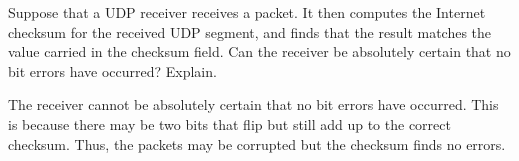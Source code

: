 \documentclass{report}
\begin{document}
\mktitle

\begin{problem}
Suppose that a UDP receiver receives a packet. It then computes the Internet checksum for the received UDP segment, and finds that the result matches the value carried in the checksum field. Can the receiver be absolutely certain that no bit errors have occurred? Explain.
\medskip

\begin{answer}{50em}
    The receiver cannot be absolutely certain that no bit errors have occurred. This is because there
    may be two bits that flip but still add up to the correct checksum. Thus, the packets may be 
    corrupted but the checksum finds no errors.
\end{answer}

\end{problem}
\end{document}
